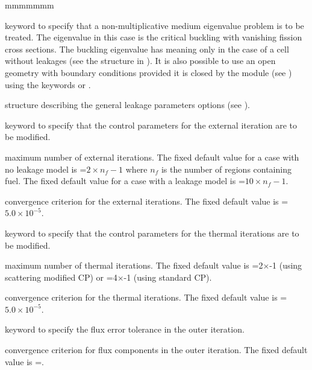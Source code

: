 \begin{ListeDeDescription}{mmmmmmm}
\item[\moc{L}] keyword to specify that a non-multiplicative medium eigenvalue
problem is to be treated. The eigenvalue in this case is the critical buckling
with vanishing fission cross sections. The buckling eigenvalue has meaning only in the
case of a cell without leakages (see the structure  in
). It is also possible to use an open geometry with
 boundary conditions  provided it is closed by the  module
(see ) using the keywords  or .

\item[\dstr{descleak}] structure describing the general leakage parameters
options (see ).

\item[\moc{EXTE}] keyword to specify that the control parameters for the
external iteration are to be modified. 

\item[\dusa{maxout}] maximum number of external iterations. The fixed default
value for a case with no leakage model is =$2\times n_{f}-1$ where
$n_{f}$ is the number of regions containing fuel. The fixed default value for a
case with a leakage model is =$10\times n_{f}-1$.

\item[\dusa{epsout}] convergence criterion for the external iterations. The
fixed default value is =$5.0\times 10^{-5}$.

\item[\moc{THER}] keyword to specify that the control parameters for the
thermal iterations are to be modified.

\item[\dusa{maxthr}] maximum number of thermal iterations. The fixed default
value is =2$\times$-1 (using scattering modified CP)
or =4$\times$-1 (using standard CP).

\item[\dusa{epsthr}] convergence criterion for the thermal iterations. The
fixed default value is =$5.0\times 10^{-5}$.

\item[\moc{UNKT}] keyword to specify the flux error tolerance in
the outer iteration.

\item[\dusa{epsunk}] convergence criterion for flux components in the outer
iteration. The fixed default value is =.


\end{ListeDeDescription}
